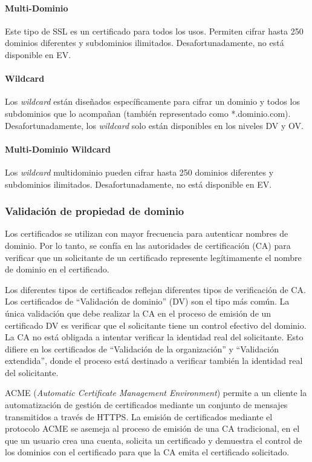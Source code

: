   \paragraph*{Multi-Dominio}
  Este tipo de SSL es un certificado para todos los usos. Permiten cifrar 
  hasta 250 dominios diferentes y subdominios 
  ilimitados. Desafortunadamente, no está disponible en EV.
  
  \paragraph*{Wildcard}
  
  Los \emph{wildcard} están diseñados específicamente para cifrar un dominio y 
  todos los subdominios que lo acompañan (también representado como *.dominio.com). 
  Desafortunadamente, los \emph{wildcard} solo están disponibles en los 
  niveles DV y OV.
  
  \paragraph*{Multi-Dominio Wildcard}
  Los \emph{wildcard} multidominio pueden cifrar hasta 250 dominios diferentes 
  y subdominios ilimitados. Desafortunadamente, no está disponible en EV.

  
\subsubsection*{Validación de propiedad de dominio}

Los certificados se utilizan con mayor frecuencia para autenticar 
nombres de dominio. Por lo tanto, se confía en las autoridades de 
certificación (CA) para verificar que un solicitante de un certificado 
represente legítimamente el nombre de dominio en el certificado.

Los diferentes tipos de certificados reflejan diferentes tipos de 
verificación de CA. Los certificados de “Validación de dominio” (DV) son 
el tipo más común. La única validación que debe realizar la CA en el 
proceso de emisión de un certificado DV es verificar que el solicitante 
tiene un control efectivo del dominio. La CA no está obligada a intentar 
verificar la identidad real del solicitante. Esto difiere en los certificados 
de “Validación de la organización” y “Validación extendida”, 
donde el proceso está destinado a verificar también la identidad real del 
solicitante.

ACME (\emph{Automatic Certificate Management Environment})
permite a un cliente 
la automatización de gestión de certificados 
mediante un conjunto de mensajes transmitidos a través de HTTPS. La 
emisión de certificados mediante el protocolo ACME se asemeja al proceso 
de emisión de una CA tradicional, en el que un usuario crea una cuenta, 
solicita un certificado y demuestra el control de los dominios con el 
certificado para que la CA emita el certificado solicitado.


